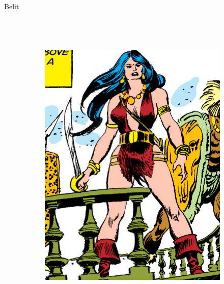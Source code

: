 \begin{frame}{Belit}
\begin{columns}
\begin{figure}[htp]
\begin{subfigure}[b]{0.27\textwidth}
			\end{subfigure}
			~
			\begin{subfigure}[b]{0.23\textwidth}
				\includegraphics[width=\textwidth]{img/belit/CTB}
			\end{subfigure}
		\end{figure}
	\end{columns}
\end{frame}
\note[itemize]{
	\item
}

